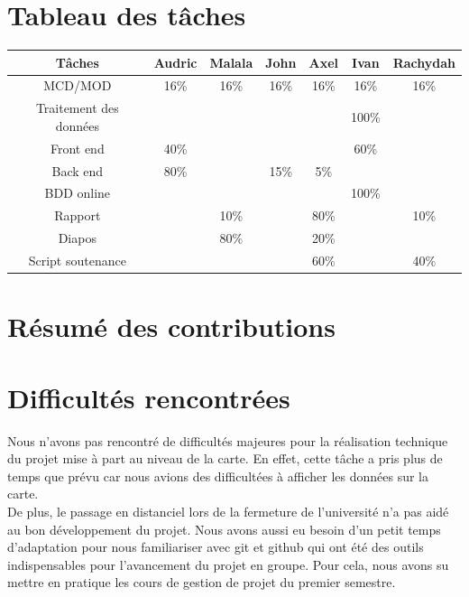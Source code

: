 \documentclass[12pt,a4paper]{report}
\begin{document}
\section{Tableau des tâches}
\begin{tabular}{|c|c|c|c|c|c|c|}
\hline
Tâches & Audric & Malala & John & Axel & Ivan & Rachydah \\
\hline
MCD/MOD & 16\% & 16\% & 16\% & 16\% & 16\% & 16\%\\
\hline
Traitement des données & & & & & 100\% & \\
\hline
Front end & 40\% & & & & 60\% & \\
\hline
Back end & 80\% & & 15\% & 5\% & &\\
\hline
BDD online & & & & & 100\% & \\
\hline
Rapport & & 10\% & & 80\% & & 10\% \\
\hline
Diapos & & 80\% & & 20\% & & \\
\hline
Script soutenance & & & & 60\% & & 40\% \\
\hline
\end{tabular}

\section{Résumé des contributions}
 \begin{center}
\end{center}

\section{Difficultés rencontrées}
Nous n'avons pas rencontré de difficultés majeures pour la réalisation technique du projet mise à part au niveau de la carte. En effet, cette tâche a pris plus de temps que prévu car nous avions des difficultées à afficher les données sur la carte. \\

De plus, le passage en distanciel lors de la fermeture de l'université n'a pas aidé au bon développement du projet. Nous avons aussi eu besoin d'un petit temps d'adaptation pour nous familiariser avec git et github qui ont été des outils indispensables pour l'avancement du projet en groupe. Pour cela, nous avons su mettre en pratique les cours de gestion de projet du premier semestre. \\
\end{document}
